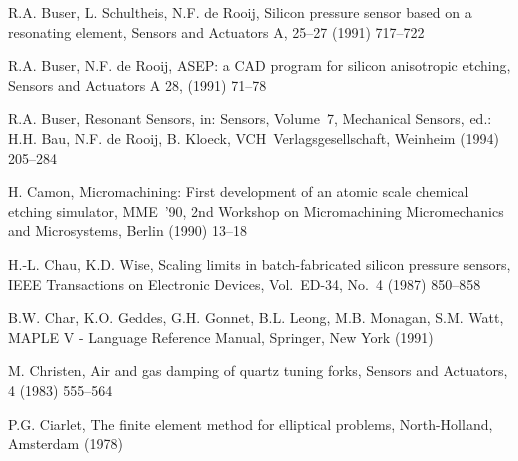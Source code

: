 \begin{thebibliography}{xxx}

 R.A. Buser, L. Schultheis, N.F. de Rooij, Silicon pressure sensor based on a
 resonating element, Sensors and Actuators A, 25--27 (1991) 717--722

 R.A. Buser, N.F. de Rooij, {\sf ASEP}: a CAD program for silicon
 anisotropic etching, Sensors and Actuators A 28, (1991) 71--78

 R.A. Buser, Resonant Sensors, in: Sensors, Volume~7, Mechanical Sensors,
 ed.: H.H. Bau, N.F. de Rooij, B. Kloeck, VCH~Verlagsgesellschaft,
 Weinheim (1994) 205--284

 H. Camon, Micromachining: First development of an atomic scale chemical
 etching simulator, MME~'90, 2nd Workshop on Micromachining Micromechanics
 and Microsystems, Berlin (1990) 13--18

 H.-L. Chau, K.D. Wise, Scaling limits in batch-fabricated silicon pressure
 sensors, IEEE Transactions on Electronic Devices, Vol.~ED-34, No.~4
 (1987) 850--858


 B.W. Char, K.O. Geddes, G.H. Gonnet, B.L. Leong, M.B. Monagan, S.M. Watt,
 {\sf MAPLE V} - Language Reference Manual, Springer, New York (1991)

 M. Christen, Air and gas damping of quartz tuning forks, Sensors and
 Actuators, 4 (1983) 555--564

 P.G. Ciarlet, The finite element method for elliptical problems,
 North-Holland, Amsterdam (1978)




\end{thebibliography}
